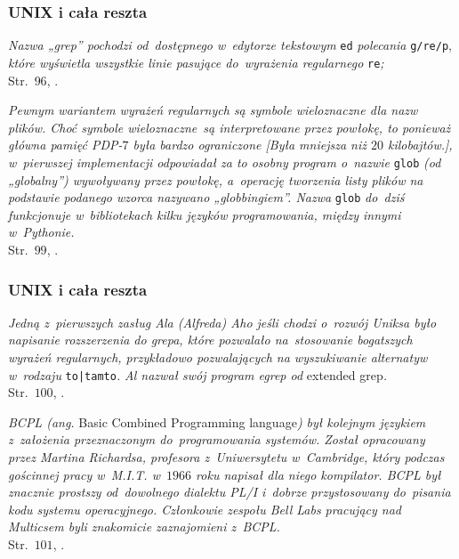 \documentclass[10pt,t]{beamer}
\begin{document}
\begin{frame}
  \frametitle{UNIX i cała reszta}


  \textit{Nazwa „grep” pochodzi od~dostępnego w~edytorze tekstowym}
  \texttt{ed} \textit{polecania} \texttt{g/re/p}, \textit{które
    wyświetla wszystkie linie pasujące do~wyrażenia regularnego}
  \texttt{re}\textit{;} \\[0.3em]
  Str.~$96$, \parencite{Kernighan-Jak-Unix-tworzyl-historie-Pub-2021}.

  \textit{Pewnym wariantem wyrażeń regularnych są symbole wieloznaczne
    dla nazw plików. Choć symbole wieloznaczne~są interpretowane
    przez powłokę, to ponieważ główna pamięć PDP-$7$ była bardzo
    ograniczone [Była mniejsza niż $20$ kilobajtów.], w~pierwszej
    implementacji odpowiadał za to osobny program o~nazwie}
  \texttt{glob} \textit{(od „globalny”) wywoływany przez powłokę,
    a~operację tworzenia listy plików na podstawie podanego wzorca
    nazywano „globbingiem”. Nazwa} \texttt{glob} \textit{do~dziś
    funkcjonuje w~bibliotekach kilku języków programowania, między
    innymi w~Pythonie.} \\[0.3em]
  Str.~$99$, \parencite{Kernighan-Jak-Unix-tworzyl-historie-Pub-2021}.

\end{frame}





\begin{frame}
  \frametitle{UNIX i cała reszta}


  \textit{Jedną z~pierwszych zasług Ala (Alfreda) Aho jeśli chodzi
    o~rozwój Uniksa było napisanie rozszerzenia do grepa, które pozwalało
    na~stosowanie bogatszych wyrażeń regularnych, przykładowo pozwalających
    na wyszukiwanie alternatyw w~rodzaju} \texttt{to|tamto}\textit{.}
  \textit{Al nazwał swój program egrep od} extended
  grep\textit{.} \\[0.3em]
  Str.~$100$, \parencite{Kernighan-Jak-Unix-tworzyl-historie-Pub-2021}.

  \textit{BCPL (ang. } Basic Combined Programming language\textit{)
    był kolejnym językiem z~założenia przeznaczonym do~programowania
    systemów. Został opracowany przez Martina Richardsa, profesora
    z~Uniwersytetu w~Cambridge, który podczas gościnnej pracy w~M.I.T.
    w~$1966$ roku napisał dla niego kompilator. BCPL był znacznie
    prostszy od~dowolnego dialektu PL/I i~dobrze przystosowany do~pisania
    kodu systemu operacyjnego. Członkowie zespołu Bell Labs pracujący
    nad Multicsem byli znakomicie zaznajomieni z~BCPL.} \\[0.3em]
  Str.~$101$, \parencite{Kernighan-Jak-Unix-tworzyl-historie-Pub-2021}.

\end{frame}
\end{document}
